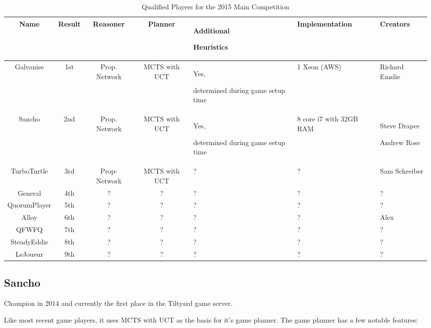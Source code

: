 \begin{table}[h]
\caption{Qualified Players for the 2015 Main Competition}
\label{2015 World Competition}
\small
\begin{tabular}{| c | c | c | c | p{2.5cm} | p{2.5cm} | p{2.5cm} |}
\hline  Name & Result & Reasoner & Planner & Additional \par Heuristics & Implementation & Creators \\
\hline  Galvanise & 1st & Prop. Network & MCTS with UCT & Yes, \par determined during game setup time & 1 Xeon (AWS) & Richard Emslie \\
\hline  Sancho & 2nd & Prop. Network & MCTS with UCT & Yes, \par determined during game setup time & 8 core i7 with 32GB RAM & Steve Draper \par Andrew Rose \\
\hline  TurboTurtle & 3rd & Prop- Network & MCTS with UCT & ? & ? & Sam Schreiber \\
\hline  General & 4th & ? & ? & ? & ? & ? \\ %
\hline  QuorumPlayer & 5th & ? & ? & ? & ? & ? \\ %
\hline  Alloy & 6th & ? & ? & ? & ? & Alex \\ %
\hline  QFWFQ & 7th & ? & ? & ? & ? & ? \\ %
\hline  SteadyEddie & 8th & ? & ? & ? & ? & ? \\ %
\hline  LeJoueur & 9th & ? & ? & ? & ? & ? \\ %

\hline
\end{tabular}
\end{table}


\subsection{Sancho}
Champion in 2014 and currently the first place in the Tiltyard game server.

Like most recent game players, it uses \gls{MCTS} with \gls{UCT} as the  basis for it's game planner. The game planner has a few notable features: 

